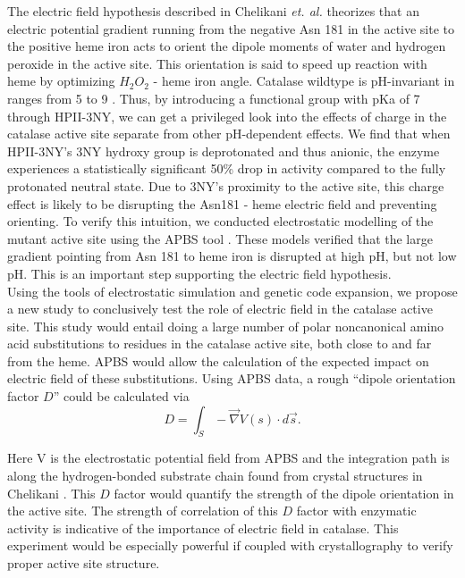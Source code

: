 \documentclass[9pt,twocolumn,twoside]{pnas-new}
\begin{document}
The electric field hypothesis described in Chelikani \textit{et. al.} \cite{electricpotential} theorizes that an electric potential gradient running from the negative Asn 181 in the active site to the positive heme iron acts to orient the dipole moments of water and hydrogen peroxide in the active site. This orientation is said to speed up reaction with heme by optimizing $H_2O_2$ - heme iron angle. Catalase wildtype is pH-invariant in ranges from 5 to 9 \cite{phdependence}. Thus, by introducing a functional group with pKa of 7 through HPII-3NY, we can get a privileged look into the effects of charge in the catalase active site separate from other pH-dependent effects. We find that when HPII-3NY's 3NY hydroxy group is deprotonated and thus anionic, the enzyme experiences a statistically significant 50\% drop in activity compared to the fully protonated neutral state. Due to 3NY's proximity to the active site, this charge effect is likely to be disrupting the Asn181 - heme electric field and preventing orienting. To verify this intuition, we conducted electrostatic modelling of the mutant active site using the APBS tool \cite{apbs}. These models verified that the large gradient pointing from Asn 181 to heme iron is disrupted at high pH, but not low pH. This is an important step supporting the electric field hypothesis.\\

Using the tools of electrostatic simulation and genetic code expansion, we propose a new study to conclusively test the role of electric field in the catalase active site. This study would entail doing a large number of polar noncanonical amino acid substitutions to residues in the catalase active site, both close to and far from the heme. APBS would allow the calculation of the expected impact on electric field of these substitutions. Using APBS data, a rough ``dipole orientation factor $D$'' could be calculated via\\

\begin{equation*}
  D = \int_S -\vec{\nabla} V(s) \cdot d\vec{s}.
\end{equation*}

Here V is the electrostatic potential field from APBS and the integration path is along the hydrogen-bonded substrate chain found from crystal structures in Chelikani \cite{electricpotential}. This $D$ factor would quantify the strength of the dipole orientation in the active site. The strength of correlation of this $D$ factor with enzymatic activity is indicative of the importance of electric field in catalase. This experiment would be especially powerful if coupled with crystallography to verify proper active site structure.\\
\end{document}
